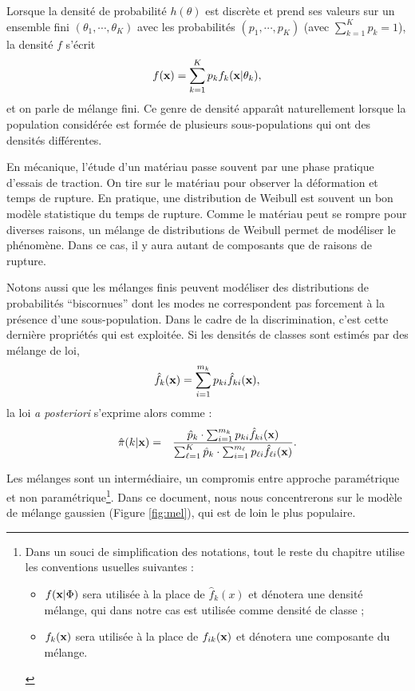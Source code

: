 Lorsque la densit\'e de probabilit\'e $h(\theta)$ est discr\`ete et
prend ses valeurs sur un ensemble fini $(\theta_1,\cdots,\theta_K)$
avec les probabilit\'es $(p_1,\cdots,p_K)$ (avec $\sum_{k=1}^K p_k=1$),
la densit\'e $f$ s'\'ecrit
\begin{equation}
f(\mbox{\bf x})=\sum_{k=1}^K p_k f_k(\mbox{\bf x} | \theta_k),
\end{equation}
et on parle de m\'elange fini. Ce genre de densit\'e appara\^\i t naturellement
lorsque la population consid\'er\'ee est form\'ee de plusieurs sous-populations
qui ont des densit\'es diff\'erentes. 

\begin{ex}
En m\'ecanique, l'\'etude d'un mat\'eriau passe souvent par une phase
pratique d'essais de traction. On tire sur le mat\'eriau pour
observer la d\'eformation  et temps de rupture. En pratique,
une distribution de Weibull est souvent un bon mod\`ele statistique
du temps de rupture. Comme le mat\'eriau peut se rompre pour 
diverses raisons, un m\'elange de distributions de Weibull
permet de mod\'eliser le ph\'enom\`ene. Dans ce cas, il y aura
autant de composants que de raisons de rupture. 
\end{ex}

Notons aussi que les m\'elanges finis peuvent mod\'eliser des distributions
de probabilit\'es ``biscornues'' dont les modes ne correspondent pas forcement
\`a la pr\'esence d'une sous-population.  Dans le cadre de la discrimination,
c'est cette derni\`ere propri\'et\'es qui est exploit\'ee.
Si les densit\'es de classes sont estim\'es par des m\'elange de loi,
$$
\hat{f}_k(\mbox{\bf x})=\sum_{i=1}^{m_k} p_{ki} \hat{f}_{ki}(\mbox{\bf x}),
$$
la loi {\em a posteriori} s'exprime alors comme :
\begin{eqnarray*}
\hat{\pi}(k| \mbox{\bf x}) & = & \frac{\hat{p}_k \cdot \sum_{i=1}^{m_k} p_{ki} \hat{f}_{ki}(\mbox{\bf x})}{\sum_{\ell=1}^{K} \hat{p}_k \cdot \sum_{i=1}^{m_\ell} p_{\ell i}\hat{f}_{\ell i}(\mbox{\bf x})}.
\end{eqnarray*}

Les m\'elanges sont un  interm\'ediaire, un compromis entre approche 
param\'etrique et non param\'etrique\footnote{Dans un souci de simplification 
des notations, tout le reste du chapitre utilise 
les conventions usuelles suivantes :
\begin{itemize}
\item
$f(\mbox{\bf x}|\Phi)$ sera utilis\'ee \`a la place de $\hat{f}_{k}(x)$ et d\'enotera 
une densit\'e m\'elange, qui dans notre cas est utilis\'ee
comme densit\'e de classe ;
\item 
$f_k(\mbox{\bf x})$ sera utilis\'ee \`a la place de $f_{ik}(\mbox{\bf x})$ et d\'enotera  une composante du m\'elange.
\end{itemize}
}.
Dans ce document, nous nous concentrerons
sur le mod\`ele de m\'elange gaussien (Figure \ref{fig:mel}),
qui est de loin le plus  populaire. 

